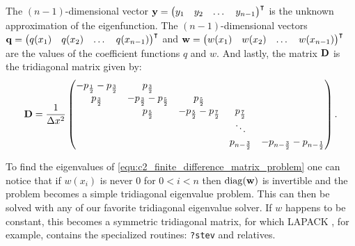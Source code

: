 The $(n-1)$-dimensional vector $\vb{y} = {\begin{pmatrix}y_1 & y_2 & \dots & y_{n-1}\end{pmatrix}}^\intercal$ is the unknown approximation of the eigenfunction. The $(n-1)$-dimensional vectors $\vb{q} = {\begin{pmatrix}q(x_1) & q(x_2) & \dots & q(x_{n-1})\end{pmatrix}}^\intercal$  and $\vb{w} = {\begin{pmatrix}w(x_1) & w(x_2) & \dots & w(x_{n-1})\end{pmatrix}}^\intercal$ are the values of the coefficient functions $q$ and $w$. And lastly, the matrix $\vb{D}$ is the tridiagonal matrix given by:
$$
    \vb{D} = \frac{1}{\Delta x^2}\begin{pmatrix}
        -p_{\frac{1}{2}} -p_{\frac{3}{2}} & p_{\frac{3}{2}}                   &                                   &                     &                                            \\
        p_{\frac{3}{2}}                   & -p_{\frac{3}{2}} -p_{\frac{5}{2}} & p_{\frac{5}{2}}                   &                     &                                            \\
                                          & p_{\frac{5}{2}}                   & -p_{\frac{5}{2}} -p_{\frac{7}{2}} & p_{\frac{7}{2}}     &                                            \\
                                          &                                   &                                   & \ddots              &                                            \\
                                          &                                   &                                   & p_{n - \frac{3}{2}} & -p_{n - \frac{3}{2}} - p_{n - \frac{1}{2}} \\
    \end{pmatrix}{}\text{.}
$$

To find the eigenvalues of \eqref{equ:c2_finite_difference_matrix_problem} one can notice that if $w(x_i)$ is never $0$ for $0 < i < n$ then $\operatorname{diag}(\vb{w})$ is invertible and the problem becomes a simple tridiagonal eigenvalue problem. This can then be solved with any of our favorite tridiagonal eigenvalue solver. If $w$ happens to be constant, this becomes a symmetric tridiagonal matrix, for which LAPACK \cite{lapack}, for example, contains the specialized routines: \texttt{?stev} and relatives.

